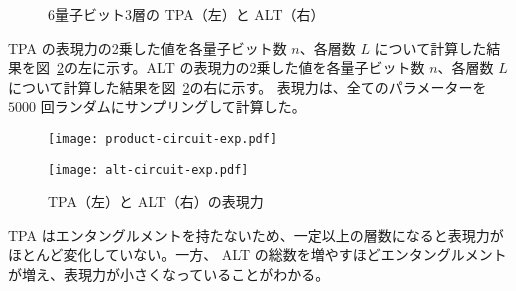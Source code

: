 \begin{figure}[H]
    \caption{6量子ビット3層の TPA（左）と ALT（右）}
    \label{fig:tpa-alt}
\end{figure}

TPA の表現力の2乗した値を各量子ビット数 $n$、各層数 $L$ について計算した結果を図~\ref{fig:circuit-exp}の左に示す。ALT の表現力の2乗した値を各量子ビット数 $n$、各層数 $L$ について計算した結果を図~\ref{fig:circuit-exp}の右に示す。
表現力は、全てのパラメーターを $5000$ 回ランダムにサンプリングして計算した。

\begin{figure}[H]
    \begin{minipage}[b]{0.5\columnwidth}
        \centering
        \texttt{[image: product-circuit-exp.pdf]}
    \end{minipage}
    \hspace{0\columnwidth}
    \begin{minipage}[b]{0.5\columnwidth}
        \centering
        \texttt{[image: alt-circuit-exp.pdf]}
    \end{minipage}
    \caption{TPA（左）と ALT（右）の表現力}
    \label{fig:circuit-exp}
\end{figure}

TPA はエンタングルメントを持たないため、一定以上の層数になると表現力がほとんど変化していない。一方、
ALT の総数を増やすほどエンタングルメントが増え、表現力が小さくなっていることがわかる。
